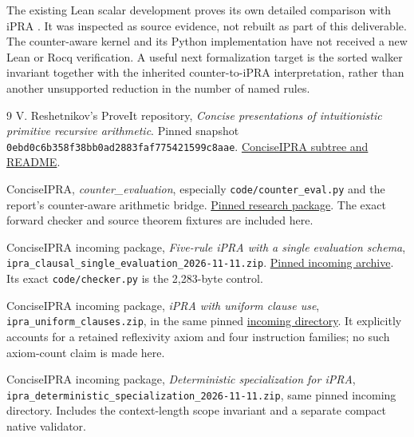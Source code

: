The existing Lean scalar development proves its own detailed comparison
with iPRA \cite{lean}. It was inspected as source evidence, not rebuilt
as part of this deliverable. The counter-aware kernel and its Python
implementation have not received a new Lean or Rocq verification. A
useful next formalization target is the sorted walker invariant together
with the inherited counter-to-iPRA interpretation, rather than another
unsupported reduction in the number of named rules.

\begin{thebibliography}{9}
V. Reshetnikov's ProveIt repository,
\emph{Concise presentations of intuitionistic primitive recursive arithmetic}.
Pinned snapshot
\texttt{0ebd0c6b358f38bb0ad2883faf775421599c8aae}.
\href{https://github.com/VladimirReshetnikov/ProveIt/tree/0ebd0c6b358f38bb0ad2883faf775421599c8aae/Logic/PrimitiveRecursiveArithmetic/ConciseIPRA}{ConciseIPRA subtree and README}.

ConciseIPRA, \emph{counter\_evaluation}, especially
\texttt{code/counter\_eval.py} and the report's counter-aware arithmetic bridge.
\href{https://github.com/VladimirReshetnikov/ProveIt/tree/0ebd0c6b358f38bb0ad2883faf775421599c8aae/Logic/PrimitiveRecursiveArithmetic/ConciseIPRA/Research/counter_evaluation}{Pinned research package}.
The exact forward checker and source theorem fixtures are included here.

ConciseIPRA incoming package,
\emph{Five-rule iPRA with a single evaluation schema},
\texttt{ipra\_clausal\_single\_evaluation\_2026-11-11.zip}.
\href{https://github.com/VladimirReshetnikov/ProveIt/blob/0ebd0c6b358f38bb0ad2883faf775421599c8aae/Logic/PrimitiveRecursiveArithmetic/ConciseIPRA/docs/incoming/ipra_clausal_single_evaluation_2026-11-11.zip}{Pinned incoming archive}.
Its exact \texttt{code/checker.py} is the 2,283-byte control.

ConciseIPRA incoming package,
\emph{iPRA with uniform clause use},
\texttt{ipra\_uniform\_clauses.zip}, in the same pinned
\href{https://github.com/VladimirReshetnikov/ProveIt/tree/0ebd0c6b358f38bb0ad2883faf775421599c8aae/Logic/PrimitiveRecursiveArithmetic/ConciseIPRA/docs/incoming}{incoming directory}.
It explicitly accounts for a retained reflexivity axiom and four
instruction families; no such axiom-count claim is made here.

ConciseIPRA incoming package,
\emph{Deterministic specialization for iPRA},
\texttt{ipra\_deterministic\_specialization\_2026-11-11.zip},
same pinned incoming directory. Includes the context-length scope
invariant and a separate compact native validator.


\end{thebibliography}
